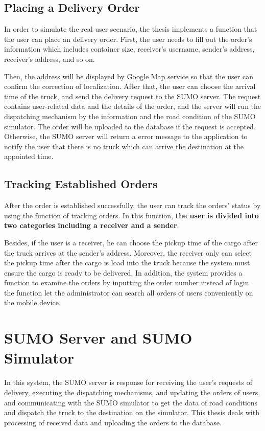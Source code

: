 \documentclass[12pt]{ksthesis}
\begin{document}
\begin{thesis}
{\subsection{Placing a Delivery Order}
In order to simulate the real user scenario, the thesis implements a function that the user can place an delivery order. First, the user needs to fill out the order’s information which includes container size, receiver’s username, sender’s address, receiver’s address, and so on. 

Then, the address will be displayed by Google Map service so that the user can confirm the correction of localization. After that, the user can choose the arrival time of the truck, and send the delivery request to the SUMO server. The request contains user-related data and the details of the order, and the server will run the dispatching mechanism by the information and the road condition of the SUMO simulator. The order will be uploaded to the database if the request is accepted. Otherwise, the SUMO server will return a error message to the application to notify the user that there is no truck which can arrive the destination at the appointed time.

\subsection{Tracking Established Orders}
After the order is established successfully, the user can track the orders’ status by using the function of tracking orders. In this function, \textbf{the user is divided into two categories including a receiver and a sender}.

Besides, if the user is a receiver, he can choose the pickup time of the cargo after the truck arrives at the sender’s address.  
Moreover, the receiver only can select the pickup time after the cargo is load into the truck because the system must ensure the cargo is ready to be delivered. 
In addition, the system provides a function to examine the orders by inputting the order number instead of login. the function let the administrator can search all orders of users conveniently on the mobile device.

\section{SUMO Server and SUMO Simulator}
In this system, the SUMO server is response for receiving the user’s requests of delivery, executing the dispatching mechanisms, and updating the orders of users, and communicating with the SUMO simulator to get the data of road conditions and dispatch the truck to the destination on the simulator. This thesis deals with processing of received data and uploading the orders to the database.

}
\end{thesis}
\end{document}
